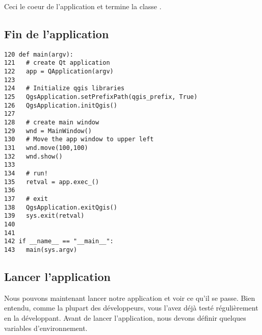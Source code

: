Ceci le coeur de l'application et termine la classe .

\subsection{Fin de l'application}


\begin{verbatim}
120 def main(argv):
121   # create Qt application
122   app = QApplication(argv)
123 
124   # Initialize qgis libraries
125   QgsApplication.setPrefixPath(qgis_prefix, True)
126   QgsApplication.initQgis()
127 
128   # create main window
129   wnd = MainWindow()
130   # Move the app window to upper left
131   wnd.move(100,100)
132   wnd.show()
133 
134   # run!
135   retval = app.exec_()
136   
137   # exit
138   QgsApplication.exitQgis()
139   sys.exit(retval)
140 
141 
142 if __name__ == "__main__":
143   main(sys.argv)
\end{verbatim}

\subsection{Lancer l'application}

Nous pouvons maintenant lancer notre application et voir ce qu'il se passe. Bien entendu, comme la plupart des d\'eveloppeurs, vous l'avez d\'ej\`a test\'e r\'eguli\`erement en la d\'eveloppant.
Avant de lancer l'application, nous devons d\'efinir quelques variables d'environnement.

